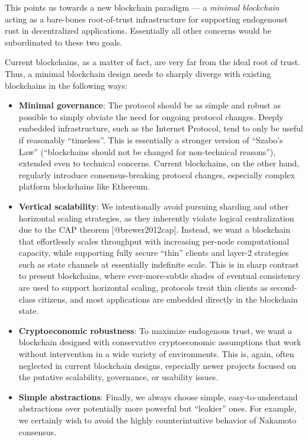 \documentclass[]{article}
\providecommand{\tightlist}{%
  \setlength{\itemsep}{0pt}\setlength{\parskip}{0pt}}
\begin{document}
This points us towards a new blockchain paradigm --- a \emph{minimal
blockchain} acting as a bare-bones root-of-trust infrastructure for
supporting endogenoust rust in decentralized applications. Essentially
all other concerns would be subordinated to these two goals.

Current blockchains, as a matter of fact, are very far from the ideal
root of trust. Thus, a minimal blockchain design needs to sharply
diverge with existing blockchains in the following ways:

\begin{itemize}
\tightlist
\item
  \textbf{Minimal governance}: The protocol should be as simple and
  robust as possible to simply obviate the need for ongoing protocol
  changes. Deeply embedded infrastructure, such as the Internet
  Protocol, tend to only be useful if reasonably ``timeless''. This is
  essentially a stronger version of ``Szabo's Law'' (``blockchains
  should not be changed for non-technical reasons''), extended even to
  technical concerns. Current blockchains, on the other hand, regularly
  introduce consensus-breaking protocol changes, especially complex
  platform blockchains like Ethereum.
\item
  \textbf{Vertical scalability}: We intentionally avoid pursuing
  sharding and other horizontal scaling strategies, as they inherently
  violate logical centralization due to the CAP theorem
  {[}@brewer2012cap{]}. Instead, we want a blockchain that effortlessly
  scales throughput with increasing per-node computational capacity,
  while supporting fully secure ``thin'' clients and layer-2 strategies
  such as state channels at essentially indefinite scale. This is in
  sharp contrast to present blockchains, where ever-more-subtle shades
  of eventual consistency are used to support horizontal scaling,
  protocols treat thin clients as second-class citizens, and most
  applications are embedded directly in the blockchain state.
\item
  \textbf{Cryptoeconomic robustness}: To maximize endogenous trust, we
  want a blockchain designed with conservative cryptoeconomic
  assumptions that work without intervention in a wide variety of
  environments. This is, again, often neglected in current blockchain
  designs, especially newer projects focused on the putative
  scalability, governance, or usability issues.
\item
  \textbf{Simple abstractions}: Finally, we always choose simple,
  easy-to-understand abstractions over potentially more powerful but
  ``leakier'' ones. For example, we certainly wish to avoid the highly
  counterintuitive behavior of Nakamoto consensus.
\end{itemize}
\end{document}
